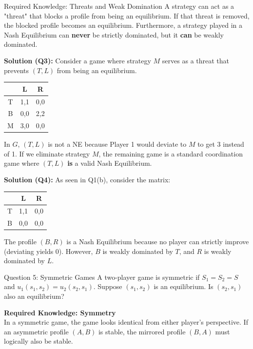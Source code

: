 \documentclass[12pt, a4paper]{article}
\begin{document}
\begin{defbox}{Required Knowledge: Threats and Weak Domination}
A strategy can act as a "threat" that blocks a profile from being an equilibrium. If that threat is removed, the blocked profile becomes an equilibrium. 
Furthermore, a strategy played in a Nash Equilibrium can \textbf{never} be strictly dominated, but it \textbf{can} be weakly dominated.
\end{defbox}

\textbf{Solution (Q3):} Consider a game where strategy $M$ serves as a threat that prevents $(T,L)$ from being an equilibrium.
\begin{center}
\renewcommand{\arraystretch}{1.2}
\begin{tabular}{c|cc}
  & L & R \\
\hline
T & 1,1 & 0,0 \\
B & 0,0 & 2,2 \\
M & 3,0 & 0,0 \\
\end{tabular}
\end{center}
In $G$, $(T,L)$ is not a NE because Player 1 would deviate to $M$ to get 3 instead of 1. If we eliminate strategy $M$, the remaining game is a standard coordination game where $(T,L)$ \textbf{is} a valid Nash Equilibrium.

\textbf{Solution (Q4):} As seen in Q1(b), consider the matrix:
\begin{center}
\renewcommand{\arraystretch}{1.2}
\begin{tabular}{c|cc}
  & L & R \\
\hline
T & 1,1 & 0,0 \\
B & 0,0 & 0,0 \\
\end{tabular}
\end{center}
The profile $(B,R)$ is a Nash Equilibrium because no player can strictly improve (deviating yields 0). However, $B$ is weakly dominated by $T$, and $R$ is weakly dominated by $L$.

\newpage
\begin{exbox}{Question 5: Symmetric Games}
A two-player game is symmetric if $S_1 = S_2 = S$ and $u_1(s_1,s_2) = u_2(s_2,s_1)$. Suppose $(s_1,s_2)$ is an equilibrium. Is $(s_2,s_1)$ also an equilibrium?
\end{exbox}

\begin{notebox}
\textbf{Required Knowledge: Symmetry} \\
In a symmetric game, the game looks identical from either player's perspective. If an asymmetric profile $(A,B)$ is stable, the mirrored profile $(B,A)$ must logically also be stable.
\end{notebox}
\end{document}
